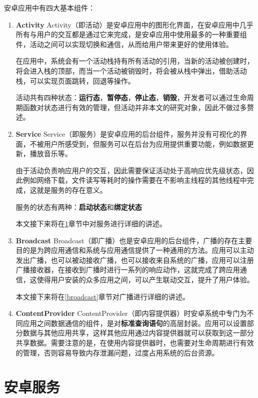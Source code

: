 安卓应用中有四大基本组件：
\begin{enumerate}
	\item \textbf{Activity } Activity（即活动）是安卓应用中的图形化界面，在安卓应用中几乎所有与用户的交互都是通过它来完成，是安卓应用中使用最多的一种重要组件，活动之间可以实现切换和通信，从而给用户带来更好的使用体验。
	
	在应用中，系统会有一个活动栈持有所有活动的引用，当新的活动被创建时，将会进入栈的顶部，而当一个活动被销毁时，将会被从栈中弹出，借助活动栈，可以实现页面跳转，回退等操作。
	
	活动共有四种状态：\textbf{运行态}，\textbf{暂停态}，\textbf{停止态}，\textbf{销毁}，开发者可以通过生命周期函数对状态进行有效的管理，但活动并非本文的研究对象，因此不做过多赘述。
	
	\item \textbf{Service } Service（即服务）是安卓应用的后台组件，服务并没有可视化的界面，不被用户所感受到，但服务可以在后台为应用提供重要功能，例如数据更新，播放音乐等。
	
	由于活动负责响应用户的交互，因此需要保证活动处于高响应优先级状态，因此例如网络下载，文件读写等耗时的操作需要在不影响主线程的其他线程中完成，这就是服务的存在意义。
	
	服务的状态有两种：\textbf{启动状态}和\textbf{绑定状态}
	
	本文接下来将在\ref{service}章节中对服务进行详细的讲述。
	
	\item \textbf{Broadcast } Broadcast（即广播）也是安卓应用的后台组件，广播的存在主要目的是为跨应用通信和系统与应用通信提供了一种通用的方法。应用可以主动发出广播，也可以被动接收广播，也可以接收来自系统的广播，应用可以注册广播接收器，在接收到广播时进行一系列的响应动作，这就完成了跨应用通信，这使得用户安装的众多应用之间，可以产生联动交互，提升了用户体验。
	
	本文接下来将在\ref{broadcast}章节对广播进行详细的讲述。
	
	\item \textbf{ContentProvider } ContentProvider（即内容提供器）时安卓系统中专门为不同应用之间数据通信的组件，是对\textbf{标准查询语句}的高层封装。应用可以设置部分数据与其他应用共享，这样其他应用通过内容提供器就可以获取到这一部分共享数据。需要注意的是，在使用内容提供器时，也需要对生命周期进行有效的管理，否则容易导致内存泄漏问题，过度占用系统的后台资源。
\end{enumerate}
\section{安卓服务}\label{service}

